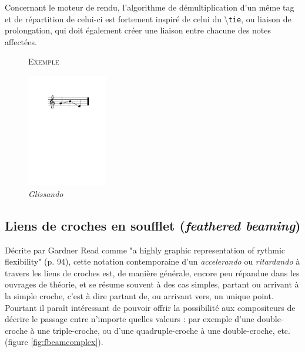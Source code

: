 \documentclass{article}
\newenvironment{gmncode}	{\vspace{-2mm}\small\verbatim}{\endverbatim\vspace{-2mm}}
\newcommand{\code}[1]		{{\small \texttt{#1}}}
\newcommand{\guidotag}[1]	{\textbackslash\code{#1}}
\newcommand{\exemple}		{\vspace{2mm}\hspace*{-3mm}\textsc{Exemple}}
\begin{document}
Concernant le moteur de rendu, l'algorithme de démultiplication d'un même tag et de répartition de celui-ci est fortement inspiré de celui du \guidotag{tie}, ou liaison de prolongation, qui doit également créer une liaison entre chacune des notes affectées.


\begin{figure}[h]
\exemple
\begin{gmncode}
  [ \glissando(g b d) ]
\end{gmncode}

\begin{center}
\includegraphics[width=35mm]{img/glissando1.pdf}
\end{center}
\caption{\emph{Glissando}}
\label{fig:glissandoSimple}
\end{figure}


\subsection{Liens de croches en soufflet (\emph{feathered beaming})}\label{subsec:featheredBeaming}

Décrite par Gardner Read comme "a highly graphic representation of rythmic flexibility"  \cite{read1969music} (p. 94), cette notation contemporaine d'un \emph{accelerando} ou \emph{ritardando} à travers les liens de croches est, de manière générale, encore peu répandue dans les ouvrages de théorie, et se résume souvent à des cas simples, partant ou arrivant à la simple croche, c'est à dire partant de, ou arrivant vers, un unique point. Pourtant il paraît intéressant de pouvoir offrir la possibilité aux compositeurs de décrire le passage entre n'importe quelles valeurs : par exemple d'une double-croche à une triple-croche, ou d'une quadruple-croche à une double-croche, etc. (figure \ref{fig:fbeamcomplex}).
\end{document}
